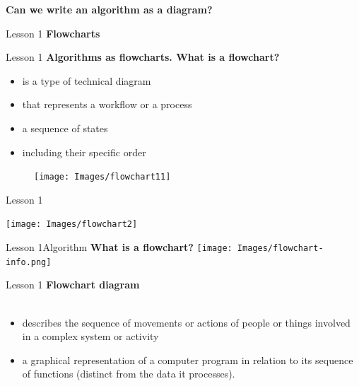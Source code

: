 \documentclass[aspectratio=1610]{beamer}
\begin{document}
\begin{frame}
\begin{center}
\Huge 
\textbf {Can we write an algorithm as a diagram?}
\end{center}
\end{frame}

\begin{frame}{Lesson 1}{}
\LARGE
\textbf{Flowcharts}
\end{frame}


\begin{frame}{Lesson 1}{}
{\Large\textbf{{Algorithms as flowcharts. What is a flowchart?}}} 
\Large
\begin{minipage}{0.60\textwidth}
    \begin{itemize}
	  \item is a type of technical diagram
      \item that represents a workflow or a process
      \item a sequence of states
      \item including their specific order
    \end{itemize}
  \end{minipage}
\begin{minipage}{.\textwidth}
      \begin{figure}
        \texttt{[image: Images/flowchart11]}
      \end{figure}
  \end{minipage}  
\end{frame}


\begin{frame}{Lesson 1}{}
\begin{center}
\texttt{[image: Images/flowchart2]}
\end{center}
\end{frame}


\begin{frame}{Lesson 1}{Algorithm}
{\Large\textbf{{What is a flowchart?}}}
\texttt{[image: Images/flowchart-info.png]}
\end{frame}



\begin{frame}{Lesson 1}{}
\LARGE
\textbf{Flowchart diagram}\\~\\
\begin{itemize}
	\item describes the sequence of movements or actions of people or things involved in a complex system or activity
	\item a graphical representation of a computer program in relation to its sequence of functions (distinct from the data it processes).
\end{itemize}
\end{frame}
\end{document}
